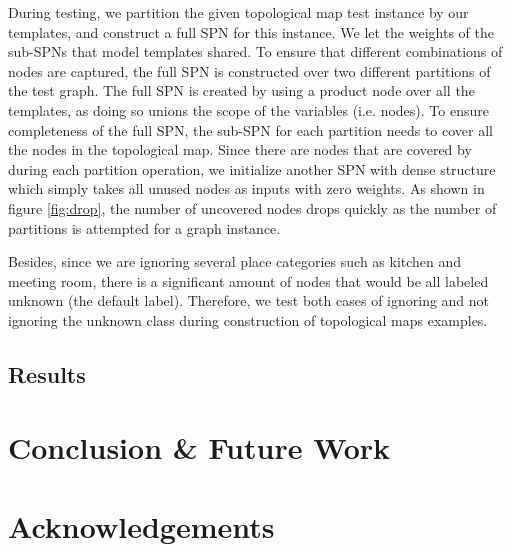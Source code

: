 \documentclass[10pt, titlepage]{article}
\theoremstyle{definition}
\begin{document}
During testing, we partition the given topological map test instance by our templates, and construct a full SPN for this instance. We let the weights of the sub-SPNs that model templates shared.  To ensure that different combinations of nodes are captured, the full SPN is constructed over two different partitions of the test graph. The full SPN is created by using a product node over all the templates, as doing so unions the scope of the variables (i.e. nodes). To ensure completeness of the full SPN, the sub-SPN for each partition needs to cover all the nodes in the topological map. Since there are nodes that are covered by during each partition operation, we initialize another SPN with dense structure which simply takes all unused nodes as inputs with zero weights. As shown in figure \ref{fig:drop}, the number of uncovered nodes drops quickly as the number of partitions is attempted for a graph instance.

Besides, since we are ignoring several place categories such as kitchen and meeting room, there is a significant amount of nodes that would be all labeled unknown (the default label). Therefore, we test both cases of ignoring and not ignoring the unknown class during construction of topological maps examples.

\subsection{Results}\label{section:results}

\newpage
\section{Conclusion \& Future Work}\label{section:conclusion}

\newpage
\section{Acknowledgements}\label{section:acknowledgement}

\newpage
\nocite{*}




\newpage
\appendix
\end{document}

